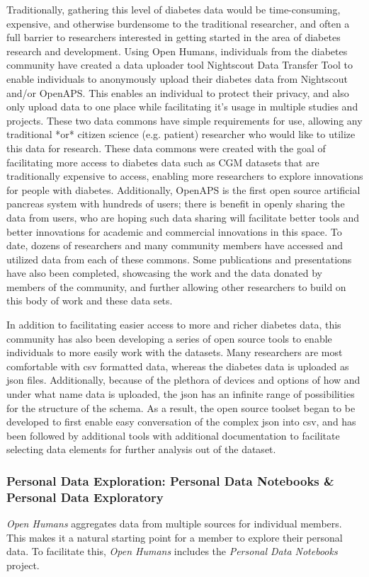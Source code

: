 \documentclass[a4paper,num-refs]{oup-contemporary}
\begin{document}
Traditionally, gathering this level of diabetes data would be time-consuming, expensive, and otherwise burdensome to the traditional researcher, and often a full barrier to researchers interested in getting started in the area of diabetes research and development. Using {Open Humans}, individuals from the diabetes community have created a data uploader tool {Nightscout Data Transfer Tool} to enable individuals to anonymously upload their diabetes data from Nightscout and/or OpenAPS. This enables an individual to protect their privacy, and also only upload data to one place while facilitating it's usage in multiple studies and projects. These two data commons have simple requirements for use, allowing any traditional *or* citizen science (e.g. patient) researcher who would like to utilize this data for research. These data commons were created with the goal of facilitating more access to diabetes data such as CGM datasets that are traditionally expensive to access, enabling more researchers to explore innovations for people with diabetes. Additionally, OpenAPS is the first open source artificial pancreas system with hundreds of users; there is benefit in openly sharing the data from users, who are hoping such data sharing will facilitate better tools and better innovations for academic and commercial innovations in this space. To date, dozens of researchers and many community members have accessed and utilized data from each of these commons. Some publications and presentations have also been completed, showcasing the work and the data donated by members of the community, and further allowing other researchers to build on this body of work and these data sets.

In addition to facilitating easier access to more and richer diabetes data, this community has also been developing a series of open source tools to enable individuals to more easily work with the datasets. Many researchers are most comfortable with csv formatted data, whereas the diabetes data is uploaded as json files. Additionally, because of the plethora of devices and options of how and under what name data is uploaded, the json has an infinite range of possibilities for the structure of the schema. As a result, the open source toolset began to be developed to first enable easy conversation of the complex json into csv, and has been followed by additional tools with additional documentation to facilitate selecting data elements for further analysis out of the dataset.

\subsubsection{Personal Data Exploration: Personal Data Notebooks \& Personal Data Exploratory}
\textit{Open Humans} aggregates data from multiple sources for individual members. This makes it a natural starting point for a member to explore their personal data. To facilitate this, \textit{Open Humans} includes the \textit{Personal Data Notebooks} project. 
\end{document}
